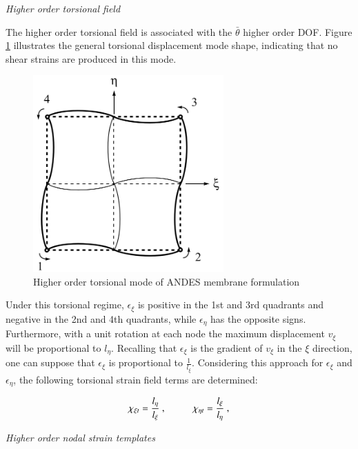 \textit{Higher order torsional field}

The higher order torsional field is associated with the $\bar{\theta}$ higher order DOF. Figure \ref{fig:AndesTorsional} illustrates the general torsional displacement mode shape, indicating that no shear strains are produced in this mode.

\begin{figure}[H]
	\centering
	\def\svgwidth{\columnwidth}
	\includegraphics[width=7.3cm]{images/ANDES_torsional_mode.png}
	\caption{Higher order torsional mode of ANDES membrane formulation \cite{Hau94}}
	\label{fig:AndesTorsional}
\end{figure}

Under this torsional regime, $\epsilon_\xi$ is positive in the 1st and 3rd quadrants and negative in the 2nd and 4th quadrants, while $\epsilon_\eta$ has the opposite signs. Furthermore, with a unit rotation at each node the maximum displacement $v_\xi$ will be proportional to $l_\eta$. Recalling that $\epsilon_{\xi}$ is the gradient of $v_\xi$ in the $\xi$ direction, one can suppose that $\epsilon_{\xi}$ is proportional to $\frac{1}{l_\xi}$. Considering this approach for $\epsilon_{\xi}$ and $\epsilon_{\eta}$, the following torsional strain field terms are determined:

\begin{equation} 
\chi_{\xi t} = \frac{l_\eta}{l_\xi}\ ,
\hspace{10mm}
\chi_{\eta t} = \frac{l_\xi}{l_\eta}\ ,
\label{equation13}
\end{equation}

\textit{Higher order nodal strain templates}

